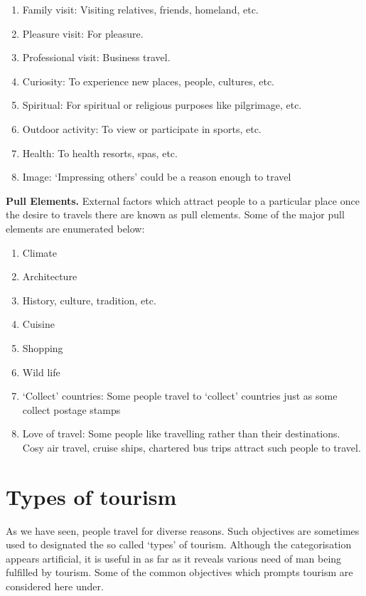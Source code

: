 \begin{enumerate}
  \item Family visit: Visiting relatives, friends, homeland, etc.
  \item Pleasure visit: For pleasure.
  \item Professional visit: Business travel.
  \item Curiosity: To experience new places, people, cultures, etc.
  \item Spiritual: For spiritual or religious purposes like pilgrimage, etc.
  \item Outdoor activity: To view or participate in sports, etc.
  \item Health: To health resorts, spas, etc.
  \item Image: `Impressing others' could be a reason enough to travel
\end{enumerate}

\textbf{Pull Elements.} External factors which attract people to a particular place once the desire to travels there are known as pull elements. Some of the major pull elements are enumerated below:

\begin{enumerate}
  \item Climate
  \item Architecture
  \item History, culture, tradition, etc.
  \item Cuisine
  \item Shopping
  \item Wild life
  \item `Collect' countries: Some people travel to `collect' countries just as some collect postage stamps
  \item Love of travel: Some people like travelling rather than their destinations. Cosy air travel, cruise ships, chartered bus trips attract such people to travel.
\end{enumerate}

\section{Types of tourism} %
\label{sec:types}

As we have seen, people travel for diverse reasons. Such objectives are sometimes used to designated the so called `types' of tourism. Although the categorisation appears artificial, it is useful in as far as it reveals various need of man being fulfilled by tourism. Some of the common objectives which prompts tourism are considered here under.

